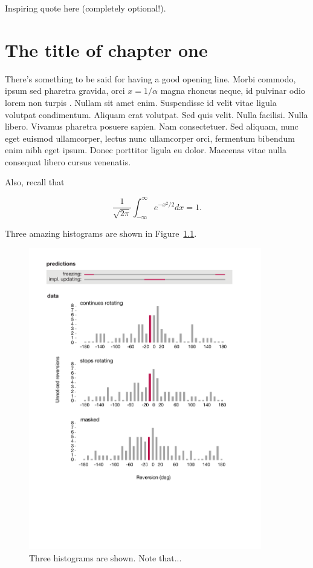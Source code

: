 \begin{savequote}[75mm]
Inspiring quote here (completely optional!). 
\end{savequote}

\chapter{The title of chapter one}

There's something to be said for having a good opening line. Morbi commodo, ipsum sed pharetra gravida, orci  $x = 1/\alpha$ magna rhoncus neque, id pulvinar odio lorem non turpis \cite{Eigen1971}. Nullam sit amet enim. Suspendisse id velit vitae ligula volutpat condimentum. Aliquam erat volutpat. Sed quis velit. Nulla facilisi. Nulla libero. Vivamus pharetra posuere sapien. Nam consectetuer. Sed aliquam, nunc eget euismod ullamcorper, lectus nunc ullamcorper orci, fermentum bibendum enim nibh eget ipsum. Donec porttitor ligula eu dolor. Maecenas vitae nulla consequat libero cursus venenatis. 

Also, recall that

$$\frac{1}{\sqrt{2\pi}} \int_{-\infty}^\infty e^{-x^2/2}dx = 1.$$

Three amazing histograms are shown in Figure~\ref{fig:label1}. 
\begin{figure}[htbp]
\begin{center}
\includegraphics[width=4in]{figures/fig2.pdf}
\caption{Three histograms are shown. Note that...}
\label{fig:label1}
\end{center}
\end{figure}
